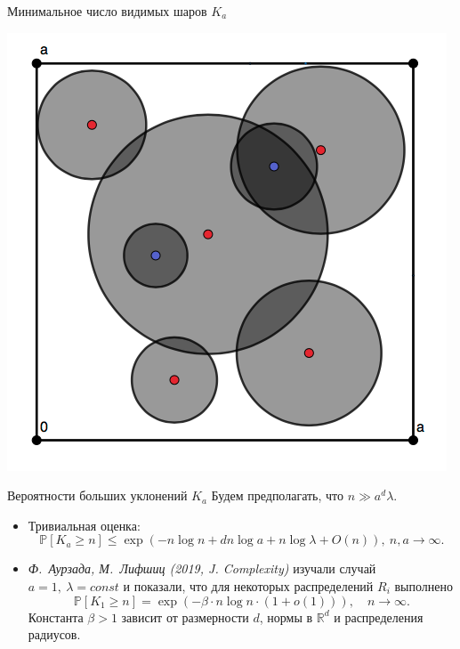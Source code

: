 \documentclass[aspectratio=1610]{beamer}
\theoremstyle{plain}
\theoremstyle{definition}
\theoremstyle{remark}
\def\geq{\geqslant}
\def\leq{\leqslant}
\newcommand{\cuplim}{\bigcup\limits}
\newcommand{\R}{\mathbb{R}}
\newcommand{\PP}{\mathbb{P}}
\begin{document}
\begin{frame}{Минимальное число видимых шаров $K_a$}
\begin{center}
  \includegraphics[scale = 0.3]{pic1.png}  
\end{center}




\end{frame}{}

\begin{frame}{Вероятности больших уклонений $K_a$} 
Будем предполагать, что $n\gg a^d\lambda$.

\begin{itemize}
    \item Тривиальная оценка:
$$ \PP[K_a \geq n] \leq 
    \exp(-n\log n + dn\log a + n\log\lambda + 
    O(n)), \ n, a\to \infty.$$
    
    \item {\it Ф.~Аурзада, М.~Лифшиц (2019, J. Complexity)} изучали случай $a=1,\ \lambda = const$ и показали, что для некоторых распределений $R_i$ выполнено 
$$\PP[K_1 \geq n] = \exp(-\beta\cdot n\log n\cdot (1 + o(1))), \quad n\to\infty.$$
Константа $\beta > 1$ зависит от размерности $d$, нормы в $\R^d$ и распределения радиусов.
\end{itemize}

\end{frame}
\end{document}
